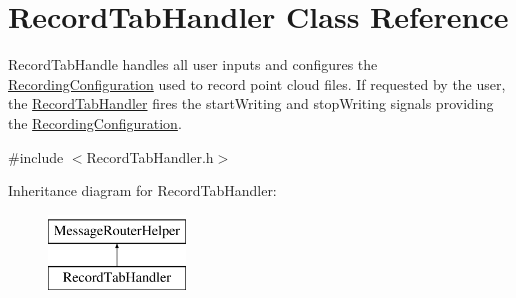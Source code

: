 \hypertarget{class_record_tab_handler}{}\section{Record\+Tab\+Handler Class Reference}
\label{class_record_tab_handler}


Record\+Tab\+Handle handles all user inputs and configures the \hyperlink{class_recording_configuration}{Recording\+Configuration} used to record point cloud files. If requested by the user, the \hyperlink{class_record_tab_handler}{Record\+Tab\+Handler} fires the start\+Writing and stop\+Writing signals providing the \hyperlink{class_recording_configuration}{Recording\+Configuration}.  




{\ttfamily \#include $<$Record\+Tab\+Handler.\+h$>$}

Inheritance diagram for Record\+Tab\+Handler\+:\begin{figure}[H]
\begin{center}
\leavevmode
\includegraphics[height=2.000000cm]{class_record_tab_handler}
\end{center}
\end{figure}
